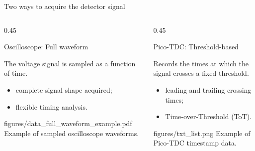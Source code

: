 \begin{frame}{Two ways to acquire the detector signal}
\small

\begin{columns}[T,totalwidth=\textwidth]

\begin{column}{0.45\textwidth}

\begin{block}{Oscilloscope: Full waveform}

The voltage signal is sampled as a function of time.

\begin{itemize}
    \item complete signal shape acquired;
    \item flexible timing analysis.
\end{itemize}
\end{block}

\vspace{0.15em}

\centering
\smartimage[0.94\linewidth]{0.34\textheight}
{figures/data_full_waveform_example.pdf}
{Example of sampled oscilloscope waveforms.}

\end{column}

\begin{column}{0.45\textwidth}

\begin{block}{Pico-TDC: Threshold-based}

Records the times at which the signal crosses a fixed threshold.

\begin{itemize}
    \item leading and trailing crossing times;
    \item Time-over-Threshold (ToT).
\end{itemize}
\end{block}

\vspace{0.15em}

\centering
\smartimage[0.82\linewidth]{0.34\textheight}
{figures/txt_list.png}
{Example of Pico-TDC timestamp data.}

\end{column}

\end{columns}

\vspace{0.25em}


\end{frame}
